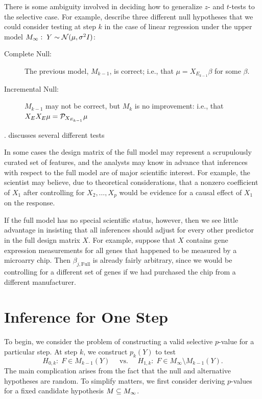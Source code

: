 \documentclass{article}
\begin{document}
There is some ambiguity involved in deciding how to generalize $z$- and $t$-tests to the selective case. For example, \citet{gsell2013sequential} describe three different null hypotheses that we could consider testing at step $k$ in the case of linear regression under the upper model $M_\infty:\; Y\sim \mathcal{N}(\mu, \sigma^2 I)$:
\begin{description}
\item[Complete Null:] The previous model, $M_{k-1}$, is correct; i.e., that $\mu = X_{E_{k-1}}\beta$ for some $\beta$.
\item[Incremental Null:] $M_{k-1}$ may not be correct, but $M_k$ is no improvement: i.e., that $X_EX_E\mu = \mathcal{P}_{X_{E_{k-1}}}\mu$
\end{description}
. \citet{fithian2014optimal} discusses several different tests 

In some cases the design matrix of the full model may represent a  scrupulously curated set of features, and the analysts may know in advance that inferences with respect to the full model are of major scientific interest. For example, the scientist may believe, due to theoretical considerations, that a nonzero coefficient of $X_1$ after controlling for $X_2,\ldots,X_p$ would be evidence for a causal effect of $X_1$ on the response.

If the full model has no special scientific status, however, then we see little advantage in insisting that all inferences should adjust for every other predictor in the full design matrix $X$. For example, suppose that $X$ contains gene expression measurements for all genes that happened to be measured by a microarry chip. Then $\beta_{j,\text{Full}}$ is already fairly arbitrary, since we would be controlling for a different set of genes if we had purchased the chip from a different manufacturer.



\section{Inference for One Step}

To begin, we consider the problem of constructing a valid selective $p$-value for a particular step. At step $k$, we construct $p_k(Y)$ to test
\[
  H_{0,k}:\; F \in M_{k-1}(Y)
  \quad \text{ vs. } \quad
  H_{1,k}:\; F \in M_\infty \setminus M_{k-1}(Y).
\]
The main complication arises from the fact that the null and alternative hypotheses are random. To simplify matters, we first consider deriving $p$-values for a fixed candidate hypothesis $M\subseteq M_{\infty}$.
\end{document}
